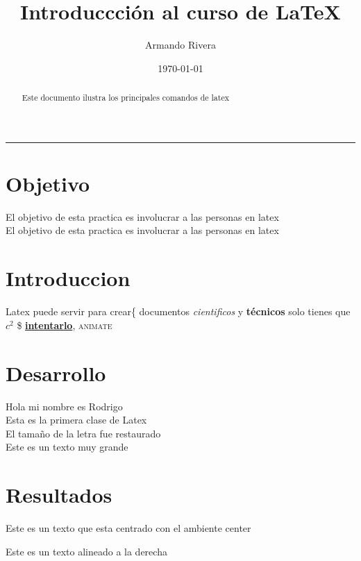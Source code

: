 \documentclass{article}
\title{Introduccción al curso de \LaTeX}
\author{Armando Rivera}
\date{\today}
\begin{document}
\maketitle
\newpage
\tableofcontents
\newpage

\rule{\textwidth}{0.5pt}
\begin{abstract}
    Este documento ilustra los principales comandos de latex
\end{abstract}


\section{Objetivo}

El objetivo  de esta practica es involucrar a las personas en latex\\
El objetivo de esta practica es involucrar a las personas en latex

\section*{Introduccion}

Latex puede servir para crear\{ documentos \textit{cientificos} y \textbf{técnicos} solo tienes que $c^2$ \$ \textbf{\underline{intentarlo}}, \textsc{animate } 


\section*{Desarrollo}

\large Hola mi nombre es Rodrigo\\[2cm]
Esta es la primera clase de Latex \\
\normalsize El tamaño de la letra fue restaurado\\
\Large \Huge  Este es un texto muy grande \normalsize

\section{Resultados}

\begin{center}
    Este es un texto que esta centrado con el ambiente center
\end{center}

\begin{flushleft}
    \lipsum
\end{flushleft}

\begin{flushright}
    Este es un texto alineado a la derecha
\end{flushright}
\end{document}

